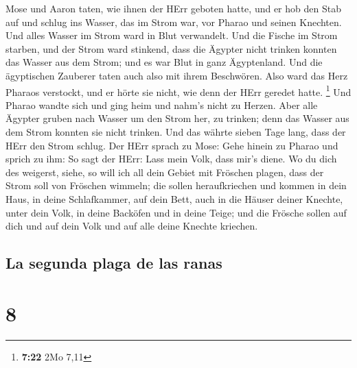  Mose und Aaron taten, wie ihnen der HErr geboten hatte,
und er hob den Stab auf und schlug ins Wasser, das im Strom war, vor
Pharao und seinen Knechten. Und alles Wasser im Strom ward in Blut
verwandelt.  Und die Fische im Strom starben, und der
Strom ward stinkend, dass die Ägypter nicht trinken konnten das Wasser
aus dem Strom; und es war Blut in ganz Ägyptenland.  Und
die ägyptischen Zauberer taten auch also mit ihrem Beschwören. Also ward
das Herz Pharaos verstockt, und er hörte sie nicht, wie denn der HErr
geredet hatte. \footnote{\textbf{7:22} 2Mo 7,11}  Und
Pharao wandte sich und ging heim und nahm's nicht zu Herzen.
 Aber alle Ägypter gruben nach Wasser um den Strom her,
zu trinken; denn das Wasser aus dem Strom konnten sie nicht trinken.
 Und das währte sieben Tage lang, dass der HErr den Strom
schlug.  Der HErr sprach zu Mose: Gehe hinein zu Pharao
und sprich zu ihm: So sagt der HErr: Lass mein Volk, dass mir's diene.
 Wo du dich des weigerst, siehe, so will ich all dein
Gebiet mit Fröschen plagen,  dass der Strom soll von
Fröschen wimmeln; die sollen heraufkriechen und kommen in dein Haus, in
deine Schlafkammer, auf dein Bett, auch in die Häuser deiner Knechte,
unter dein Volk, in deine Backöfen und in deine Teige; 
und die Frösche sollen auf dich und auf dein Volk und auf alle deine
Knechte kriechen.

\hypertarget{la-segunda-plaga-de-las-ranas}{%
\subsection{La segunda plaga de las
ranas}\label{la-segunda-plaga-de-las-ranas}}

\hypertarget{section-7}{%
\section{8}\label{section-7}}

